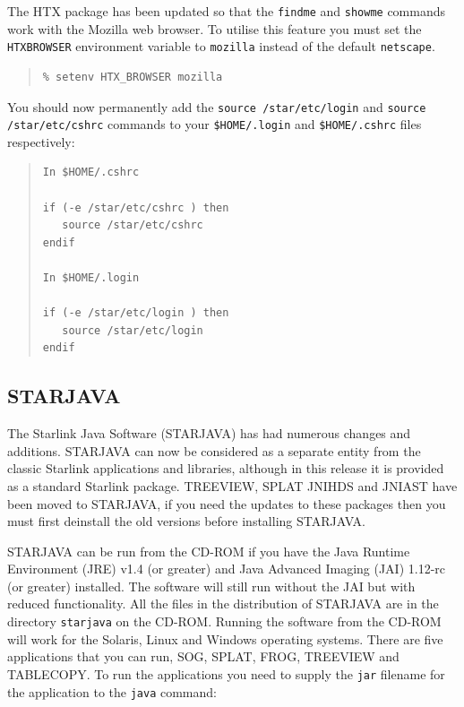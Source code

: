 \documentclass[twoside,11pt]{article}
\newcommand{\xlabel}[1]{}
\renewcommand{\_}{\texttt{\symbol{95}}}
\begin{document}
The HTX package has been updated so that the \texttt{findme} and
\texttt{showme} commands work with the Mozilla web browser. To utilise this
feature you must set the \texttt{HTX\_BROWSER} environment variable to
\texttt{mozilla} instead of the default \texttt{netscape}.

\begin{quote}
\begin{verbatim}
% setenv HTX_BROWSER mozilla
\end{verbatim}
\end{quote}

You should now permanently add the \texttt{source /star/etc/login} and
\texttt{source /star/etc/cshrc} commands to your \texttt{\$HOME/.login}
and \texttt{\$HOME/.cshrc} files respectively:

\begin{quote}
\begin{verbatim}
In $HOME/.cshrc

if (-e /star/etc/cshrc ) then
   source /star/etc/cshrc
endif

In $HOME/.login

if (-e /star/etc/login ) then
   source /star/etc/login
endif
\end{verbatim}
\end{quote}

\subsection{\xlabel{star-java}STARJAVA}

The Starlink Java Software (STARJAVA) has had numerous changes and
additions. STARJAVA can now be considered as a separate entity from
the classic Starlink applications and libraries, although in this
release it is provided as a standard Starlink package. TREEVIEW, SPLAT
JNIHDS and JNIAST have been moved to STARJAVA, if you need the updates to
these packages then you must first deinstall the old versions before
installing STARJAVA.

STARJAVA can be run from the CD-ROM if you have the Java Runtime
Environment (JRE) v1.4 (or greater) and Java Advanced Imaging (JAI)
1.1\_2-rc (or greater) installed. The software will still run without
the JAI but with reduced functionality. All the files in the distribution
of STARJAVA are in the directory \texttt{starjava} on the CD-ROM.
Running the software from the CD-ROM will work for the Solaris, Linux
and Windows operating systems. There are five applications
that you can run, SOG, SPLAT, FROG, TREEVIEW and TABLECOPY. To run
the applications you need to supply the \texttt{jar} filename for
the application to the \texttt{java} command:
\end{document}
